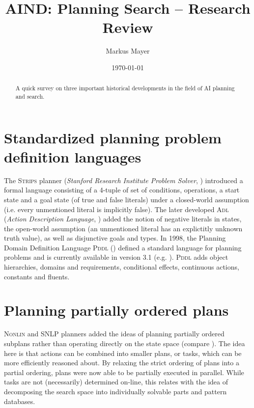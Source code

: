 \documentclass[12pt, a4paper, oneside]{article}
\title{AIND: Planning Search -- Research Review}
\author{Markus Mayer}
\date{\today}
\begin{document}
\maketitle

\begin{abstract}
A quick survey on three important historical developments in the field of AI planning and search.
\end{abstract}

\section{Standardized planning problem definition languages}

The \textsc{Strips} planner (\textit{Stanford Research Institute Problem Solver}, \cite{Fikes:1971:SNA:1622876.1622939})
introduced a formal language consisting of a 4-tuple of set of conditions, operations, 
a start state and a goal state (of true and false literals) under a closed-world
assumption (i.e. every unmentioned literal is implicitly false).
The later developed \textsc{Adl} (\textit{Action Description Language}, \cite{Pednault:1989:AEM:112922.112954}) added the
notion of negative literals in states, the open-world assumption (an unmentioned literal
has an explictitly unknown truth value), as well as disjunctive goals and types.
In 1998, the Planning Domain Definition Language \textsc{Pddl} (\cite{Ghallab98}) defined a standard
language for planning problems and is currently available in version 3.1 (e.g. \cite{Interplan14}).
\textsc{Pddl} adds object hierarchies, domains and requirements, conditional effects, continuous actions, constants and fluents.

\section{Planning partially ordered plans}

\textsc{Nonlin} and \textsc{SNLP} planners added the ideas of planning partially ordered
subplans rather than operating directly on the state space (compare \cite{russell2009artificial}).
The idea here is that actions can be combined into smaller plans, or tasks,
which can be more efficiently reasoned about.
By relaxing the strict ordering of plans into a partial ordering,
plans were now able to be partially executed in parallel.
While tasks are not (necessarily) determined on-line, this relates 
with the idea of decomposing the search space into individually solvable parts 
and pattern databases.
\end{document}
